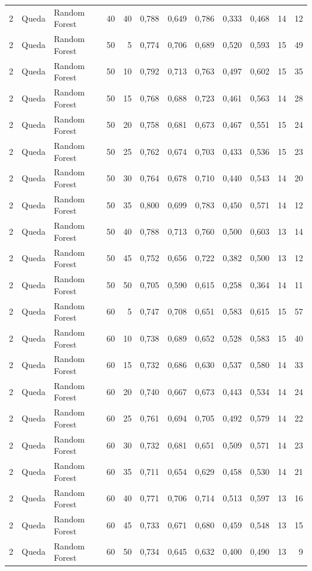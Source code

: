 \begin{longtable}{@{}rllrrrrrrrrr@{}}
2 & Queda & Random Forest & 40 & 40 & 0,788 & 0,649 & 0,786 & 0,333 & 0,468 & 14 & 12 \\
2 & Queda & Random Forest & 50 & 5 & 0,774 & 0,706 & 0,689 & 0,520 & 0,593 & 15 & 49 \\
2 & Queda & Random Forest & 50 & 10 & 0,792 & 0,713 & 0,763 & 0,497 & 0,602 & 15 & 35 \\
2 & Queda & Random Forest & 50 & 15 & 0,768 & 0,688 & 0,723 & 0,461 & 0,563 & 14 & 28 \\
2 & Queda & Random Forest & 50 & 20 & 0,758 & 0,681 & 0,673 & 0,467 & 0,551 & 15 & 24 \\
2 & Queda & Random Forest & 50 & 25 & 0,762 & 0,674 & 0,703 & 0,433 & 0,536 & 15 & 23 \\
2 & Queda & Random Forest & 50 & 30 & 0,764 & 0,678 & 0,710 & 0,440 & 0,543 & 14 & 20 \\
2 & Queda & Random Forest & 50 & 35 & 0,800 & 0,699 & 0,783 & 0,450 & 0,571 & 14 & 12 \\
2 & Queda & Random Forest & 50 & 40 & 0,788 & 0,713 & 0,760 & 0,500 & 0,603 & 13 & 14 \\
2 & Queda & Random Forest & 50 & 45 & 0,752 & 0,656 & 0,722 & 0,382 & 0,500 & 13 & 12 \\
2 & Queda & Random Forest & 50 & 50 & 0,705 & 0,590 & 0,615 & 0,258 & 0,364 & 14 & 11 \\
2 & Queda & Random Forest & 60 & 5 & 0,747 & 0,708 & 0,651 & 0,583 & 0,615 & 15 & 57 \\
2 & Queda & Random Forest & 60 & 10 & 0,738 & 0,689 & 0,652 & 0,528 & 0,583 & 15 & 40 \\
2 & Queda & Random Forest & 60 & 15 & 0,732 & 0,686 & 0,630 & 0,537 & 0,580 & 14 & 33 \\
2 & Queda & Random Forest & 60 & 20 & 0,740 & 0,667 & 0,673 & 0,443 & 0,534 & 14 & 24 \\
2 & Queda & Random Forest & 60 & 25 & 0,761 & 0,694 & 0,705 & 0,492 & 0,579 & 14 & 22 \\
2 & Queda & Random Forest & 60 & 30 & 0,732 & 0,681 & 0,651 & 0,509 & 0,571 & 14 & 23 \\
2 & Queda & Random Forest & 60 & 35 & 0,711 & 0,654 & 0,629 & 0,458 & 0,530 & 14 & 21 \\
2 & Queda & Random Forest & 60 & 40 & 0,771 & 0,706 & 0,714 & 0,513 & 0,597 & 13 & 16 \\
2 & Queda & Random Forest & 60 & 45 & 0,733 & 0,671 & 0,680 & 0,459 & 0,548 & 13 & 15 \\
2 & Queda & Random Forest & 60 & 50 & 0,734 & 0,645 & 0,632 & 0,400 & 0,490 & 13 & 9 \\

\end{longtable}
